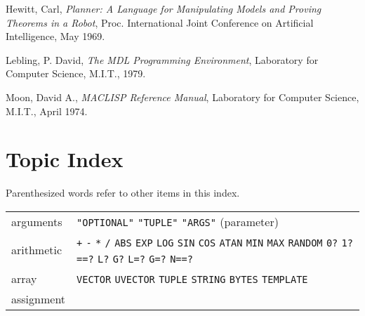 \documentclass[a4paper,]{article}
\begin{document}
Hewitt, Carl, \emph{Planner: A Language for Manipulating Models and Proving Theorems in a Robot}, Proc. International Joint
Conference on Artificial Intelligence, May 1969.

Lebling, P. David, \emph{The MDL Programming Environment}, Laboratory for Computer Science, M.I.T., 1979.

Moon, David A., \emph{MACLISP Reference Manual}, Laboratory for Computer Science, M.I.T., April 1974.

\section{Topic Index}\label{topic-index}

Parenthesized words refer to other items in this index.

\begin{longtable}[]{@{}ll@{}}
\toprule
\begin{minipage}[t]{0.11\columnwidth}\raggedright\strut
arguments\strut
\end{minipage} & \begin{minipage}[t]{0.83\columnwidth}\raggedright\strut
\texttt{"OPTIONAL"} \texttt{"TUPLE"} \texttt{"ARGS"} (parameter)\strut
\end{minipage}\tabularnewline
\begin{minipage}[t]{0.11\columnwidth}\raggedright\strut
arithmetic\strut
\end{minipage} & \begin{minipage}[t]{0.83\columnwidth}\raggedright\strut
\texttt{+} \texttt{-} \texttt{*} \texttt{/} \texttt{ABS} \texttt{EXP} \texttt{LOG} \texttt{SIN} \texttt{COS} \texttt{ATAN}
\texttt{MIN} \texttt{MAX} \texttt{RANDOM} \texttt{0?} \texttt{1?} \texttt{==?} \texttt{L?} \texttt{G?} \texttt{L=?}
\texttt{G=?} \texttt{N==?}\strut
\end{minipage}\tabularnewline
\begin{minipage}[t]{0.11\columnwidth}\raggedright\strut
array\strut
\end{minipage} & \begin{minipage}[t]{0.83\columnwidth}\raggedright\strut
\texttt{VECTOR} \texttt{UVECTOR} \texttt{TUPLE} \texttt{STRING} \texttt{BYTES} \texttt{TEMPLATE}\strut
\end{minipage}\tabularnewline
\begin{minipage}[t]{0.11\columnwidth}\raggedright\strut
assignment\strut
\end{minipage} & \begin{minipage}[t]{0.83\columnwidth}\raggedright\strut

\end{minipage}
\end{longtable}
\end{document}
